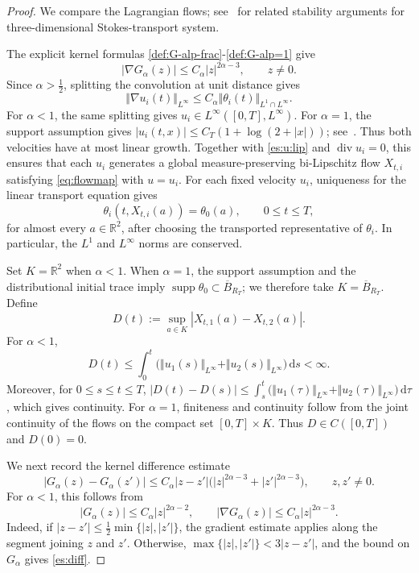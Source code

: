 \documentclass[reqno,11pt,a4paper]{amsart}
\newcommand{\dd}{\mathrm{d}}
\begin{document}
\begin{proof}
We compare the Lagrangian flows;
see~\cite[Section~4.1]{MS24} for related stability arguments for three-dimensional Stokes-transport system.

The explicit kernel formulas
\eqref{def:G-alp-frac}-\eqref{def:G-alp=1} give
\[
  |\nabla G_\alpha(z)|
  \leq C_\alpha|z|^{2\alpha-3},
  \qquad z\neq0.
\]
Since $\alpha>\frac12$, splitting the convolution
at unit distance gives
\begin{equation}\label{es:u:lip}
  \Vert \nabla u_i(t)\Vert _{L^\infty}
  \leq C_\alpha
  \Vert \theta_i(t)\Vert _{L^1\cap L^\infty}.
\end{equation}
For $\alpha<1$, the same splitting gives
$u_i\in L^\infty([0,T],L^\infty)$.
For $\alpha=1$, the support assumption gives
$|u_i(t,x)|\leq C_T(1+\log(2+|x|))$;
see~\cite[Lemma~1]{Gray23}.
Thus both velocities have at most linear growth.
Together with \eqref{es:u:lip} and
$\operatorname{div}u_i=0$, this ensures that each $u_i$
generates a global measure-preserving bi-Lipschitz flow
$X_{t,i}$ satisfying \eqref{eq:flowmap} with $u=u_i$.
For each fixed velocity $u_i$, uniqueness for the
linear transport equation gives
\begin{equation}\label{id:theta-i}
  \theta_i(t,X_{t,i}(a))=\theta_0(a),
  \qquad 0\leq t\leq T,
\end{equation}
for almost every $a\in\mathbb R^2$,
after choosing the transported representative of $\theta_i$.
In particular, the $L^1$ and $L^\infty$ norms
are conserved.

Set $K=\mathbb R^2$ when $\alpha<1$.
When $\alpha=1$, the support assumption and the
distributional initial trace imply
$\operatorname{supp}\theta_0\subset\overline B_{R_T}$;
we therefore take $K=\overline B_{R_T}$.
Define
\[
  D(t):=\sup_{a\in K}
  |X_{t,1}(a)-X_{t,2}(a)|.
\]
For $\alpha<1$,
\[
  D(t)\leq
  \int_0^t
  \bigl(\Vert u_1(s)\Vert _{L^\infty}
       +\Vert u_2(s)\Vert _{L^\infty}\bigr)\,\dd s<\infty.
\]
Moreover, for $0\leq s\leq t\leq T$,
$|D(t)-D(s)|
  \leq
  \int_s^t
  \bigl(\Vert u_1(\tau)\Vert _{L^\infty}
       +\Vert u_2(\tau)\Vert _{L^\infty}\bigr)\,\dd\tau$,
which gives continuity.
For $\alpha=1$, finiteness and continuity follow
from the joint continuity of the flows
on the compact set $[0,T]\times K$.
Thus $D\in C([0,T])$ and $D(0)=0$.

We next record the kernel difference estimate
\begin{equation}\label{es:diff}
  |G_\alpha(z)-G_\alpha(z')|
  \leq C_\alpha|z-z'|
  \bigl(|z|^{2\alpha-3}+|z'|^{2\alpha-3}\bigr),
  \qquad z,z'\neq0.
\end{equation}
For $\alpha<1$, this follows from
\[
  |G_\alpha(z)|\leq C_\alpha|z|^{2\alpha-2},
  \qquad
  |\nabla G_\alpha(z)|
  \leq C_\alpha|z|^{2\alpha-3}.
\]
Indeed, if
$|z-z'|\leq\frac12\min\{|z|,|z'|\}$,
the gradient estimate applies along the segment
joining $z$ and $z'$.
Otherwise, $\max\{|z|,|z'|\}<3|z-z'|$,
and the bound on $G_\alpha$ gives \eqref{es:diff}.


\end{proof}
\end{document}
